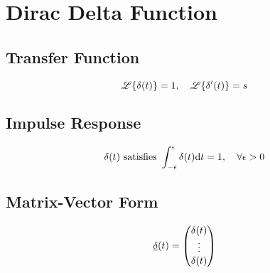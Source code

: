 \section*{Dirac Delta Function}
\subsection*{Transfer Function}
\[
    \laplace{\func{\delta}[t]} = 1, \quad \laplace{\func{\delta^{\prime}}[t]} = s
\]

\subsection*{Impulse Response}
\[
    \delta(t) \text{ satisfies } \int_{-\epsilon}^{\epsilon} \delta(t) \mathrm{d}t = 1, \quad \forall \epsilon > 0
\]

\subsection*{Matrix-Vector Form}
\[
    \func{\underline{\delta}}[t] =
    \crvector{
        \func{\delta}[t] \\
        \vdots \\
        \func{\delta}[t]
    }
\]
